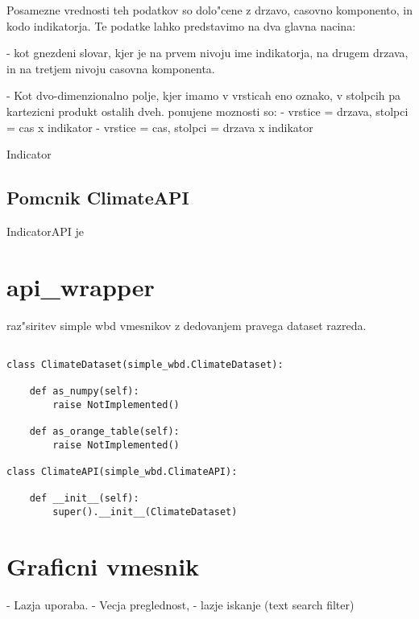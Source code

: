 Posamezne vrednosti teh podatkov so dolo"cene z drzavo, casovno komponento, in
kodo indikatorja. Te podatke lahko predstavimo na dva glavna nacina:

 - kot gnezdeni slovar, kjer je na prvem nivoju ime indikatorja, na drugem
   drzava, in na tretjem nivoju casovna komponenta.

 - Kot dvo-dimenzionalno polje, kjer imamo v vrsticah eno oznako, v stolpcih
   pa kartezicni produkt ostalih dveh. ponujene moznosti so:
   - vrstice = drzava, stolpci = cas x indikator
   - vrstice = cas, stolpci = drzava x indikator


Indicator



% 
% 
% 
% 
% 
% 




\subsection{Pomcnik ClimateAPI}

IndicatorAPI je 



% 
% 



\section{api\_wrapper}



raz"siritev simple wbd vmesnikov z dedovanjem pravega dataset razreda.

\begin{verbatim}

class ClimateDataset(simple_wbd.ClimateDataset):
    
    def as_numpy(self):
        raise NotImplemented()
    
    def as_orange_table(self):
        raise NotImplemented()

class ClimateAPI(simple_wbd.ClimateAPI):

    def __init__(self):
        super().__init__(ClimateDataset)
\end{verbatim}





\section{Graficni vmesnik}


- Lazja uporaba.
- Vecja preglednost,
- lazje iskanje (text search filter)
